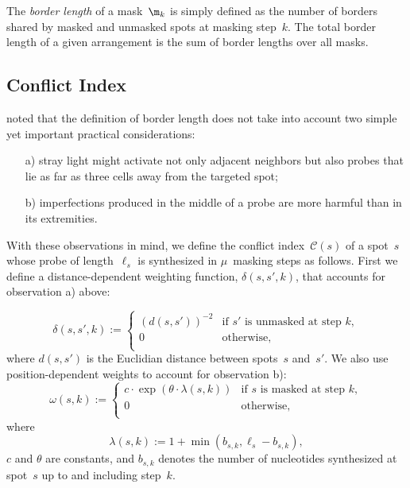 \documentclass{bioinfo}
\begin{document}
The \emph{border length} of a mask~$\m_{k}$ is simply defined as the number of borders shared by masked and unmasked spots at masking step~$k$. The total border length of a given arrangement is the sum of border lengths over all masks.

\subsection{Conflict Index}

\citealp{KAHNG03_1} noted that the definition of border length does not take into account two simple yet important practical considerations:
\begin{itemize}
\item[a)] stray light might activate not only adjacent neighbors but also probes that lie as far as three cells away from the targeted spot;
\item[b)] imperfections produced in the middle of a probe are more harmful than in its extremities.
\end{itemize}

With these observations in mind, we define the conflict index~$\mathcal{C}(s)$ of a spot~$s$ whose probe of length~$\ell_{s}$ is synthesized in $\mu$~masking steps as follows. First we define a distance-dependent weighting function, $\delta(s,s',k)$, that accounts for observation a) above:

\begin{equation}
\label{eq:dist_weight}
\delta(s,s',k) :=
        \left\{
                \begin{array}{ll}
                        (d(s,s'))^{-2} & \mbox{if $s'$ is unmasked at step $k$}, \\
                        0 & \mbox{otherwise}, \\
                \end{array}
        \right.
\end{equation}
where $d(s,s')$ is the Euclidian distance between spots~$s$ and~$s'$. We also use position-dependent weights to account for observation b):
\begin{equation}
\label{eq:pos_mult}
\omega(s,k) :=
        \left\{
                \begin{array}{ll}
                        c \cdot \exp{\left(\theta \cdot \lambda(s,k)\right)} & \mbox{if $s$ is masked at step $k$}, \\
                        0 & \mbox{otherwise}, \\
                \end{array}
        \right.
\end{equation}
where
\begin{equation}
\label{eq:base_pos}
\lambda(s,k) := 1 + \min(b_{s,k},\ell_{s} - b_{s,k}),
\end{equation}
$c$ and $\theta$ are constants, and $b_{s,k}$ denotes the number of nucleotides synthesized at spot~$s$ up to and including step~$k$.
\end{document}
